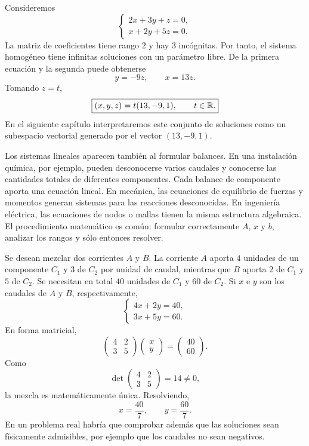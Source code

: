 \begin{example}
Consideremos
\[
\begin{cases}
2x+3y+z=0,\\
x+2y+5z=0.
\end{cases}
\]
La matriz de coeficientes tiene rango $2$ y hay $3$ incógnitas. Por tanto, el sistema homogéneo tiene infinitas soluciones con un parámetro libre. De la primera ecuación y la segunda puede obtenerse
\[
y=-9z,
\qquad
x=13z.
\]
Tomando $z=t$,
\[
\boxed{(x,y,z)=t(13,-9,1),\qquad t\in\mathbb{R}.}
\]
En el siguiente capítulo interpretaremos este conjunto de soluciones como un subespacio vectorial generado por el vector $(13,-9,1)$.
\end{example}

Los sistemas lineales aparecen también al formular balances. En una instalación química, por ejemplo, pueden desconocerse varios caudales y conocerse las cantidades totales de diferentes componentes. Cada balance de componente aporta una ecuación lineal. En mecánica, las ecuaciones de equilibrio de fuerzas y momentos generan sistemas para las reacciones desconocidas. En ingeniería eléctrica, las ecuaciones de nodos o mallas tienen la misma estructura algebraica. El procedimiento matemático es común: formular correctamente $A$, $x$ y $b$, analizar los rangos y sólo entonces resolver.

\begin{example}
Se desean mezclar dos corrientes $A$ y $B$. La corriente $A$ aporta $4$ unidades de un componente $C_1$ y $3$ de $C_2$ por unidad de caudal, mientras que $B$ aporta $2$ de $C_1$ y $5$ de $C_2$. Se necesitan en total $40$ unidades de $C_1$ y $60$ de $C_2$. Si $x$ e $y$ son los caudales de $A$ y $B$, respectivamente,
\[
\begin{cases}
4x+2y=40,\\
3x+5y=60.
\end{cases}
\]
En forma matricial,
\[
\begin{pmatrix}4&2\\3&5\end{pmatrix}
\begin{pmatrix}x\\y\end{pmatrix}
=
\begin{pmatrix}40\\60\end{pmatrix}.
\]
Como
\[
\det\begin{pmatrix}4&2\\3&5\end{pmatrix}=14\neq0,
\]
la mezcla es matemáticamente única. Resolviendo,
\[
\boxed{x=\frac{40}{7},\qquad y=\frac{60}{7}.}
\]
En un problema real habría que comprobar además que las soluciones sean físicamente admisibles, por ejemplo que los caudales no sean negativos.
\end{example}

